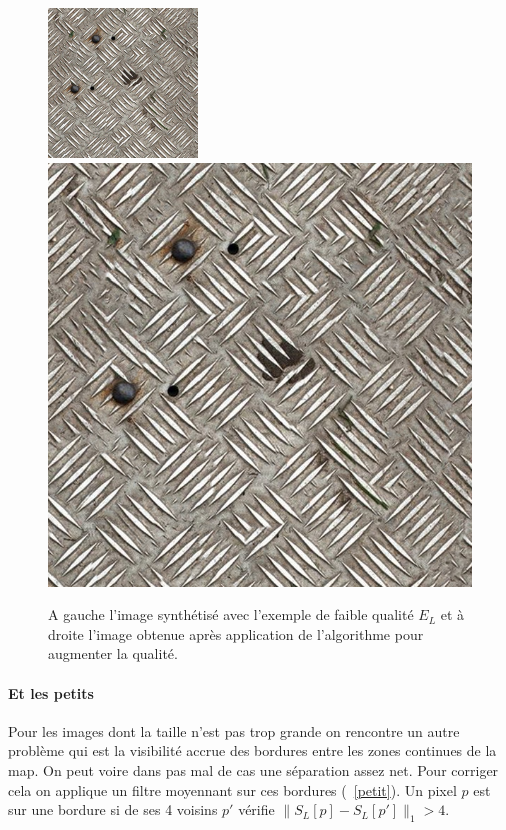 \documentclass[12pt]{article}
\begin{document}
\begin{figure}[h]
	\centering
	\includegraphics[scale=3.2]{downsized.png} \qquad \quad
	\includegraphics[scale=0.8]{magnific.png}
	\captionsetup{justification=centering}
	\caption{A gauche l'image synthétisé avec l'exemple de faible qualité $E_L$ et à droite l'image obtenue après application de l'algorithme pour augmenter la qualité.}
	\label{magn_res}
\end{figure}

\paragraph{Et les petits}
Pour les images dont la taille n'est pas trop grande on rencontre un autre problème qui est la visibilité accrue des bordures entre les zones continues de la map. On peut voire dans pas mal de cas une séparation assez net. Pour corriger cela on applique un filtre moyennant sur ces bordures (\figurename~\ref{petit}). Un pixel $p$ est sur une bordure si de ses 4 voisins $p'$ vérifie $\| S_L[p] - S_L[p'] \|_1 > 4$.
\end{document}
